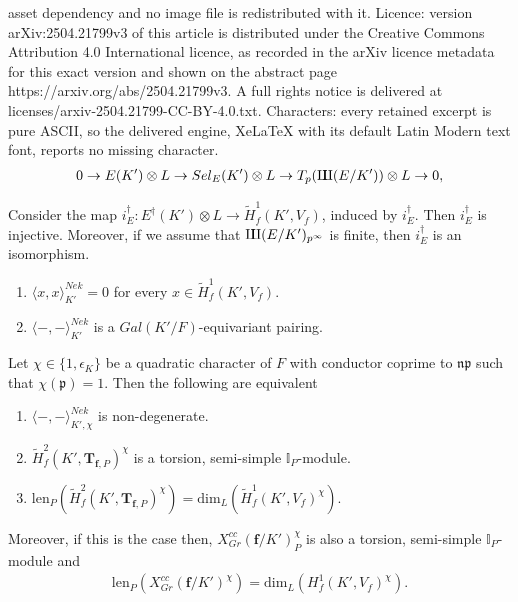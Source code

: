 \documentclass[10pt,a4paper]{amsart}
\newcommand{\I}{\mathbb{I}}
\newcommand{\T}{\mathbf{T}}
\newcommand{\Varpi}{\rotatebox[origin=c]{180}{$\Pi\kern-0.361em\Pi$}}
\newcommand{\f}{\mathbf{f}}
\newcommand{\ip}{\I_P}
\newcommand{\n}{\mathfrak{n}}
\newcommand{\p}{\mathfrak{p}}
\begin{document}
asset dependency and no image file is redistributed with it. Licence: version arXiv:2504.21799v3 of this article is distributed under the Creative Commons Attribution 4.0 International licence, as recorded in the arXiv licence metadata for this exact version and shown on the abstract page https://arxiv.org/abs/2504.21799v3. A full rights notice is delivered at licenses/arxiv-2504.21799-CC-BY-4.0.txt. Characters: every retained excerpt is pure ASCII, so the delivered engine, XeLaTeX with its default Latin Modern text font, reports no missing character.
\begin{align} \label{ses for MW group}
    0 \rightarrow E(K') \otimes L \rightarrow Sel_E(K') \otimes L \rightarrow T_p(\Varpi(E/K')) \otimes L \rightarrow 0,
\end{align}

\begin{lem} \label{iedagger is an iso}
    Consider the map $i_E^\dagger : E^\dagger(K') \otimes L \rightarrow \widetilde{H}^1_f(K',V_f)$, induced by $i_E^\dagger$. Then $i_E^\dagger$ is injective. Moreover, if we assume that $\Varpi(E/K')_{p^\infty}$ is finite, then $i_E^\dagger$ is an isomorphism.
\end{lem}

\begin{prop} \label{NonDegeneracyOfPairing}
    \begin{enumerate}
        \item $\langle x,x \rangle^{Nek}_{K'} = 0$ for every $x \in \widetilde{H}^1_f(K',V_f)$.

        \item $\langle -,- \rangle^{Nek}_{K'}$ is a $Gal(K'/F)$-equivariant pairing.
    \end{enumerate}
\end{prop}

\begin{cor} \label{NonDegeneracyEquivalence}
    Let $\chi \in \{1, \epsilon_K\}$ be a quadratic character of $F$ with conductor coprime to $\n\p$ such that $\chi(\p) = 1$. Then  the following are equivalent
    \begin{enumerate}
        \item $\langle -,- \rangle^{Nek}_{K',\chi}$ is non-degenerate.
        \item $\widetilde{H}^2_f(K',\T_{\f,P})^\chi$ is a torsion, semi-simple $\ip$-module.
        \item $\mathrm{len}_P(\widetilde{H}^2_f(K',\T_{\f,P})^\chi) = \mathrm{dim}_L(\widetilde{H}^1_f(K',V_f)^\chi)$.
    \end{enumerate}
    Moreover, if this is the case then, $X_{Gr}^{cc}(\f/K')^\chi_P$ is also a torsion, semi-simple $\ip$-module and
    \begin{align*}
        \mathrm{len}_P(X^{cc}_{Gr}(\f/K')^\chi) = \mathrm{dim}_L(H^1_f(K',V_f)^\chi).
    \end{align*}
\end{cor}
\end{document}
